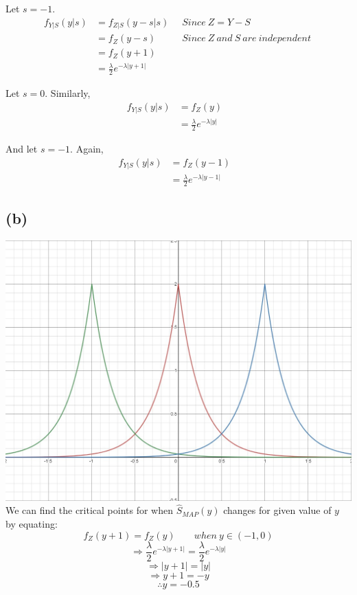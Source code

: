 \documentclass{article}
\begin{document}
	Let $s=-1$.
	$$ \begin{aligned}
		f_{Y|S} (y|s) &= f_{Z|S} (y-s|s) \; \; & Since\ Z = Y-S \\
				&= f_{Z} (y-s) & Since\ Z\ and\ S\ are\ independent\ \\
				&= f_Z (y+1) & \\
				&=\frac{\lambda}{2} e^{-\lambda |y+1|} & 
		\end{aligned} $$
\linebreak
	
	Let $s=0$. Similarly,
	$$ \begin{aligned}
		f_{Y|S} (y|s) &= f_Z (y) \\
				&=\frac{\lambda}{2} e^{-\lambda |y|} & 
		\end{aligned} $$
\linebreak

	And let $s=-1$. Again,
	$$ \begin{aligned}
		f_{Y|S} (y|s) &= f_Z (y-1) & \\
				&=\frac{\lambda}{2} e^{-\lambda |y-1|} & 
		\end{aligned} $$

\subsection*{(b)}
	\includegraphics[width=\textwidth]{plot1}
	We can find the critical points for when $\hat{S}_{MAP} (y)$ changes for given value of $y$ by equating:
	$$ f_Z (y+1) = f_Z (y) \; \; \; \; \; \; \; when\ y \in (-1,0) $$
	$$ \Rightarrow \frac{\lambda}{2} e^{-\lambda |y+1|} = \frac{\lambda}{2} e^{-\lambda |y|} $$
	$$ \Rightarrow |y+1| = |y| $$
	$$ \Rightarrow y+1 = -y $$
	$$ \therefore y= -0.5 $$
\end{document}
